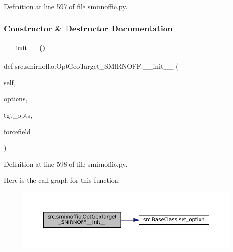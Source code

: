 Definition at line 597 of file smirnoffio.\+py.



\subsubsection{Constructor \& Destructor Documentation}
\mbox{\label{classsrc_1_1smirnoffio_1_1OptGeoTarget__SMIRNOFF_a10cdc896031c7f1fddfd4d83c777f65f}} 
\paragraph{\texorpdfstring{\+\_\+\+\_\+init\+\_\+\+\_\+()}{\_\_init\_\_()}}
{\footnotesize\ttfamily def src.\+smirnoffio.\+Opt\+Geo\+Target\+\_\+\+S\+M\+I\+R\+N\+O\+F\+F.\+\_\+\+\_\+init\+\_\+\+\_\+ (\begin{DoxyParamCaption}\item[{}]{self,  }\item[{}]{options,  }\item[{}]{tgt\+\_\+opts,  }\item[{}]{forcefield }\end{DoxyParamCaption})}



Definition at line 598 of file smirnoffio.\+py.

Here is the call graph for this function\+:
\nopagebreak
\begin{figure}[H]
\begin{center}
\leavevmode
\includegraphics[width=350pt]{classsrc_1_1smirnoffio_1_1OptGeoTarget__SMIRNOFF_a10cdc896031c7f1fddfd4d83c777f65f_cgraph}
\end{center}
\end{figure}


